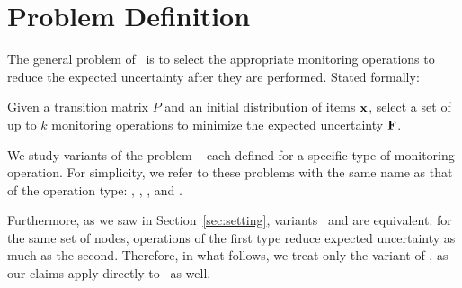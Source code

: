 \section{Problem Definition}
\label{section:problems}

The general problem of \mcproblem\ is to select the
appropriate monitoring operations to reduce
the expected uncertainty after they are performed.
Stated formally:

\begin{problem}[\mcproblem]
Given a transition matrix $P$ and an initial distribution of items $\mathbf{x}$,
select a set of up to $k$ monitoring operations 
to minimize the expected uncertainty $\mathbf{F}$. 
\end{problem}

We study variants of the problem --
each defined for a specific type of monitoring operation.
 For simplicity, we refer to these problems
 with the same name as that of the operation type:
\variant{\parentstransitions},
\variant{\nodeitems},
\variant{\childrentransitions}, 
and \variant{\edgetransitions}.

Furthermore, as we saw in Section~\ref{sec:setting},
variants
\variant{\parentstransitions}\ and
\variant{\nodeitems} are equivalent: for the same set of nodes,
operations of the first type
reduce expected uncertainty as much as the second.
Therefore, in what follows,
we treat only the variant of \variant{\nodeitems}, as  our claims apply directly to
\variant{\parentstransitions}\ as well.

